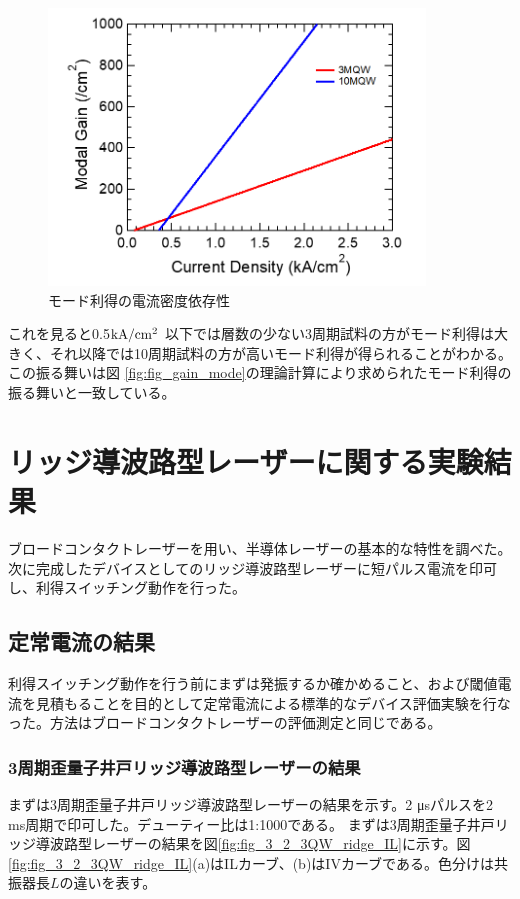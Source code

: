 {{\begin{figure}[t]
	\centering
	\includegraphics[width=10cm]{figure/fig_3_1_broadcontact_modal_gain.png}
	\caption{モード利得の電流密度依存性}
	\label{fig:fig_3_1_broadcontact_modal_gain}
\end{figure}
これを見ると0.5$ \rm{kA/cm^2}$ 以下では層数の少ない3周期試料の方がモード利得は大きく、それ以降では10周期試料の方が高いモード利得が得られることがわかる。この振る舞いは図	\ref{fig:fig_gain_mode}の理論計算により求められたモード利得の振る舞いと一致している。
\clearpage
\section{リッジ導波路型レーザーに関する実験結果}%
ブロードコンタクトレーザーを用い、半導体レーザーの基本的な特性を調べた。次に完成したデバイスとしてのリッジ導波路型レーザーに短パルス電流を印可し、利得スイッチング動作を行った。
\subsection{定常電流の結果}

利得スイッチング動作を行う前にまずは発振するか確かめること、および閾値電流を見積もることを目的として定常電流による標準的なデバイス評価実験を行なった。方法はブロードコンタクトレーザーの評価測定と同じである。
\subsubsection{3周期歪量子井戸リッジ導波路型レーザーの結果}
まずは3周期歪量子井戸リッジ導波路型レーザーの結果を示す。2 \si{\micro s}パルスを2 ms周期で印可した。デューティー比は1:1000である。
まずは3周期歪量子井戸リッジ導波路型レーザーの結果を図\ref{fig:fig_3_2_3QW_ridge_IL}に示す。図\ref{fig:fig_3_2_3QW_ridge_IL}(a)はILカーブ、(b)はIVカーブである。色分けは共振器長$L$の違いを表す。

}}
